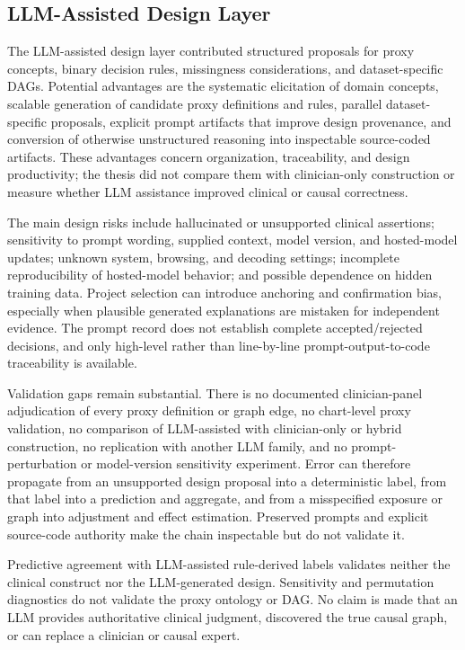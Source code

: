 \subsection{LLM-Assisted Design Layer}
\label{subsec:discussion:llm-provenance}

The LLM-assisted design layer contributed structured proposals for proxy concepts, binary decision rules, missingness considerations, and dataset-specific DAGs.  Potential advantages are the systematic elicitation of domain concepts, scalable generation of candidate proxy definitions and rules, parallel dataset-specific proposals, explicit prompt artifacts that improve design provenance, and conversion of otherwise unstructured reasoning into inspectable source-coded artifacts.  These advantages concern organization, traceability, and design productivity; the thesis did not compare them with clinician-only construction or measure whether LLM assistance improved clinical or causal correctness.

The main design risks include hallucinated or unsupported clinical assertions; sensitivity to prompt wording, supplied context, model version, and hosted-model updates; unknown system, browsing, and decoding settings; incomplete reproducibility of hosted-model behavior; and possible dependence on hidden training data.  Project selection can introduce anchoring and confirmation bias, especially when plausible generated explanations are mistaken for independent evidence.  The prompt record does not establish complete accepted/rejected decisions, and only high-level rather than line-by-line prompt-output-to-code traceability is available.

Validation gaps remain substantial.  There is no documented clinician-panel adjudication of every proxy definition or graph edge, no chart-level proxy validation, no comparison of LLM-assisted with clinician-only or hybrid construction, no replication with another LLM family, and no prompt-perturbation or model-version sensitivity experiment.  Error can therefore propagate from an unsupported design proposal into a deterministic label, from that label into a prediction and aggregate, and from a misspecified exposure or graph into adjustment and effect estimation.  Preserved prompts and explicit source-code authority make the chain inspectable but do not validate it.

Predictive agreement with LLM-assisted rule-derived labels validates neither the clinical construct nor the LLM-generated design.  Sensitivity and permutation diagnostics do not validate the proxy ontology or DAG.  No claim is made that an LLM provides authoritative clinical judgment, discovered the true causal graph, or can replace a clinician or causal expert.

